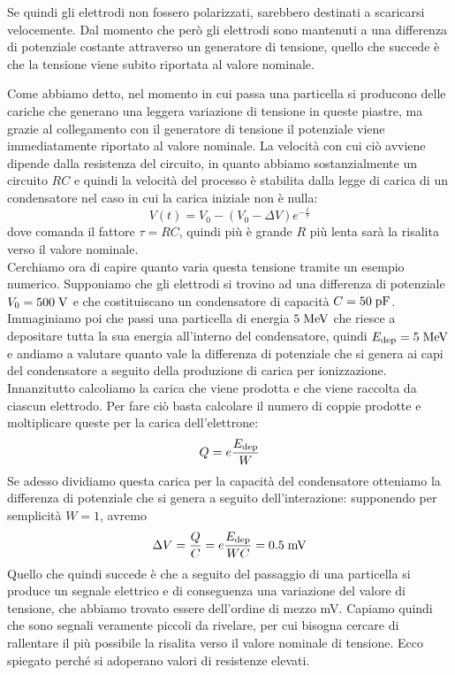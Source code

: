 \vspace{0.1cm}

Se quindi gli elettrodi non fossero polarizzati, sarebbero destinati a scaricarsi velocemente. Dal momento che però gli elettrodi sono mantenuti a una differenza di potenziale costante attraverso un generatore di tensione, quello che succede è che la tensione viene subito riportata al valore nominale.

\begin{esempio}
   Come abbiamo detto, nel momento in cui passa una particella si producono delle cariche che generano una leggera variazione di tensione in queste piastre, ma grazie al collegamento con il generatore di tensione il potenziale viene immediatamente riportato al valore nominale. La velocità con cui ciò avviene dipende dalla resistenza del circuito, in quanto abbiamo sostanzialmente un circuito $RC$ e quindi la velocità del processo è stabilita dalla legge di carica di un condensatore nel caso in cui la carica iniziale non è nulla:
   \begin{equation*}
      V(t)=V_0 - (V_0 - \Delta V) e^{-\frac{t}{\tau}}
   \end{equation*}
   dove comanda il fattore $\tau=RC$, quindi più è grande $R$ più lenta sarà la risalita verso il valore nominale.\\
   Cerchiamo ora di capire quanto varia questa tensione tramite un esempio numerico. Supponiamo che gli elettrodi si trovino ad una differenza di potenziale $V_0=500 \; \rm V$ e che costituiscano un condensatore di capacità $C=50 \; \rm pF$. Immaginiamo poi che passi una particella di energia $5 \; \rm MeV$ che riesce a depositare tutta la sua energia all'interno del condensatore, quindi $E_{\rm dep}=5 \; \rm MeV$ e andiamo a valutare quanto vale la differenza di potenziale che si genera ai capi del condensatore a seguito della produzione di carica per ionizzazione.\\
   Innanzitutto calcoliamo la carica che viene prodotta e che viene raccolta da ciascun elettrodo. Per fare ciò basta calcolare il numero di coppie prodotte e moltiplicare queste per la carica dell'elettrone:
   \begin{equation*}
      Q=e\frac{E_{\rm dep}}{W}
   \end{equation*}
   Se adesso dividiamo questa carica per la capacità del condensatore otteniamo la differenza di potenziale che si genera a seguito dell'interazione: supponendo per semplicità $W=1$, avremo
   \begin{equation*}
      \Delta V
      =\frac{Q}{C}
      =e\frac{E_{\rm dep}}{WC}
      =0.5 \; \rm mV
   \end{equation*}
   Quello che quindi succede è che a seguito del passaggio di una particella si produce un segnale elettrico e di conseguenza una variazione del valore di tensione, che abbiamo trovato essere dell'ordine di mezzo mV. Capiamo quindi che sono segnali veramente piccoli da rivelare, per cui bisogna cercare di rallentare il più possibile la risalita verso il valore nominale di tensione. Ecco spiegato perché si adoperano valori di resistenze elevati.
\end{esempio}

